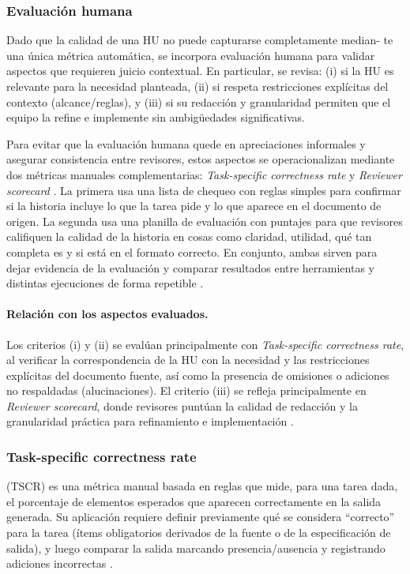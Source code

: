 \subsubsection{Evaluación humana}
Dado que la calidad de una HU no puede capturarse completamente median-
te una única métrica automática, se incorpora evaluación humana para validar
aspectos que requieren juicio contextual. En particular, se revisa: (i) si la HU es
relevante para la necesidad planteada, (ii) si respeta restricciones explícitas del
contexto (alcance/reglas), y (iii) si su redacción y granularidad permiten que el
equipo la refine e implemente sin ambigüedades significativas.

Para evitar que la evaluación humana quede en apreciaciones informales y asegurar consistencia entre revisores, estos aspectos se operacionalizan mediante dos métricas manuales complementarias: \textit{Task-specific correctness rate} y \textit{Reviewer scorecard} \cite{yu2026evaluating_genai_quality_multicase}. La primera usa una lista de chequeo con reglas simples para confirmar si la historia incluye lo que la tarea pide y lo que aparece en el documento de origen. La segunda usa una planilla de evaluación con puntajes para que revisores califiquen la calidad de la historia en cosas como claridad, utilidad, qué tan completa es y si está en el formato correcto. En conjunto, ambas sirven para dejar evidencia de la evaluación y comparar resultados entre herramientas y distintas ejecuciones de forma repetible \cite{yu2026evaluating_genai_quality_multicase}.

\paragraph{Relación con los aspectos evaluados.}
Los criterios (i) y (ii) se evalúan principalmente con \textit{Task-specific correctness rate}, al verificar la correspondencia de la HU con la necesidad y las restricciones explícitas del documento fuente, así como la presencia de omisiones o adiciones no respaldadas (alucinaciones). El criterio (iii) se refleja principalmente en \textit{Reviewer scorecard}, donde revisores puntúan la calidad de redacción y la granularidad práctica para refinamiento e implementación \cite{yu2026evaluating_genai_quality_multicase}.

\subsubsection{Task-specific correctness rate}
(TSCR) es una métrica manual basada en reglas que mide, para una tarea dada, el porcentaje de elementos esperados que aparecen correctamente en la salida generada. Su aplicación requiere definir previamente qué se considera ``correcto'' para la tarea (ítems obligatorios derivados de la fuente o de la especificación de salida), y luego comparar la salida marcando presencia/ausencia y registrando adiciones incorrectas \cite{yu2026evaluating_genai_quality_multicase}.

